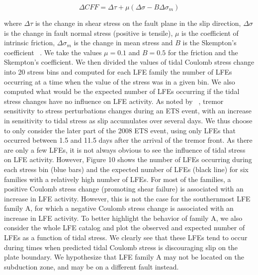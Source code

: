\documentclass[draft]{agujournal2019}
\begin{document}
\begin{linenomath*}
\begin{equation}
\Delta CFF = \Delta \tau + \mu \left( \Delta \sigma - B \Delta \sigma_m \right)
\end{equation}
\end{linenomath*}

where $\Delta \tau$ is the change in shear stress on the fault plane in the slip direction, $\Delta \sigma$ is the change in fault normal stress (positive is tensile), $\mu$ is the coefficient of intrinsic friction, $\Delta \sigma_m$ is the change in mean stress and $B$ is the Skempton's coefficient ~\cite{HOU_2015}. We take the values $\mu = 0.1$ and $B = 0.5$ for the friction and the Skempton's coefficient. We then divided the values of tidal Coulomb stress change into 20 stress bins and computed for each LFE family the number of LFEs occurring at a time when the value of the stress was in a given bin. We also computed what would be the expected number of LFEs occurring if the tidal stress changes have no influence on LFE activity. As noted by ~, tremor sensitivity to stress perturbations changes during an ETS event, with an increase in sensitivity to tidal stress as slip accumulates over several days. We thus choose to only consider the later part of the 2008 ETS event, using only LFEs that occurred between 1.5 and 11.5 days after the arrival of the tremor front. As there are only a few LFEs, it is not always obvious to see the influence of tidal stress on LFE activity. However, Figure 10 shows the number of LFEs occurring during each stress bin (blue bars) and the expected number of LFEs (black line) for six families with a relatively high number of LFEs. For most of the families, a positive Coulomb stress change (promoting shear failure) is associated with an increase in LFE activity. However, this is not the case for the southernmost LFE family A, for which a negative Coulomb stress change is associated with an increase in LFE activity. To better highlight the behavior of family A, we also consider the whole LFE catalog and plot the observed and expected number of LFEs as a function of tidal stress. We clearly see that these LFEs tend to occur during times when predicted tidal Coulomb stress is discouraging slip on the plate boundary. We hypothesize that LFE family A may not be located on the subduction zone, and may be on a different fault instead.
\end{document}
